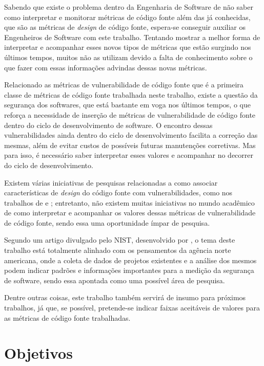 Sabendo que existe o problema dentro da Engenharia de Software de não saber como
interpretar e monitorar métricas de código fonte além das já conhecidas, que são 
as métricas de \textit{design} de código fonte, espera-se conseguir auxiliar os 
Engenheiros de Software com este trabalho. Tentando mostrar a melhor forma de 
interpretar e acompanhar esses novos tipos de métricas que estão surgindo nos últimos
tempos, muitos não as utilizam devido a falta de conhecimento sobre o que fazer
com essas informações advindas dessas novas métricas.

Relacionado as métricas de vulnerabilidade de código fonte que é a primeira
classe de métricas de código fonte trabalhada neste trabalho, existe a
questão da segurança dos softwares, que está bastante em voga nos últimos
tempos, o que reforça a necessidade de inserção de métricas de vulnerabilidade
de código fonte dentro do ciclo de desenvolvimento de software. O encontro
dessas vulnerabilidades ainda dentro do ciclo de desenvolvimento facilita a
correção das mesmas, além de evitar custos de possíveis futuras manutenções
corretivas. Mas para isso, é necessário saber interpretar esses valores
e acompanhar no decorrer do ciclo de desenvolvimento.

Existem várias iniciativas de pesquisas relacionadas a como associar
características de \textit{design} do código fonte com vulnerabilidades, como
nos trabalhos de  e
; entretanto, não
existem muitas iniciativas no mundo acadêmico de como interpretar e acompanhar
os valores dessas métricas de vulnerabilidade de código fonte, sendo essa uma
oportunidade ímpar de pesquisa.

Segundo um artigo divulgado pelo NIST, desenvolvido por , 
o tema deste trabalho está totalmente alinhado com os
pensamentos da agência norte americana, onde a coleta de dados de projetos
existentes e a análise dos mesmos podem indicar padrões e informações
importantes para a medição da segurança de software, sendo essa apontada como
uma possível área de pesquisa.

Dentre outras coisas, este trabalho também servirá de insumo para próximos
trabalhos, já que, se possível, pretende-se indicar faixas aceitáveis de valores 
para as métricas de código fonte trabalhadas.

\section{Objetivos} \label{sec:objetivos}

